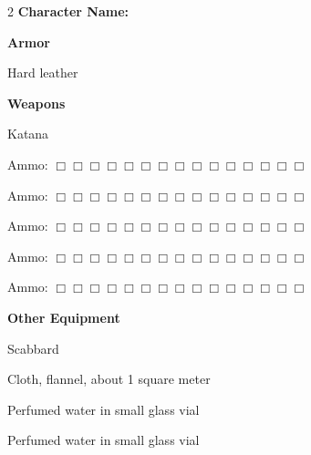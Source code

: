 \documentclass[10pt]{article}
\begin{document}
\begin{multicols}{2}
\textbf{Character Name:} \hrulefill

\vspace{24pt}

\textbf{Armor}


Hard leather




\hrulefill


\hrulefill


\hrulefill



\vspace{24pt}

\textbf{Weapons}


Katana




\hrulefill

Ammo: $\Box \Box \Box \Box \Box \Box \Box \Box \Box \Box \Box \Box \Box \Box \Box$ 


\hrulefill

Ammo: $\Box \Box \Box \Box \Box \Box \Box \Box \Box \Box \Box \Box \Box \Box \Box$ 


\hrulefill

Ammo: $\Box \Box \Box \Box \Box \Box \Box \Box \Box \Box \Box \Box \Box \Box \Box$ 


\hrulefill

Ammo: $\Box \Box \Box \Box \Box \Box \Box \Box \Box \Box \Box \Box \Box \Box \Box$ 


\hrulefill

Ammo: $\Box \Box \Box \Box \Box \Box \Box \Box \Box \Box \Box \Box \Box \Box \Box$ 



\vspace{24pt}

\textbf{Other Equipment}


Scabbard


Cloth, flannel, about 1 square meter


Perfumed water in small glass vial


Perfumed water in small glass vial




\hrulefill


\hrulefill


\hrulefill


\hrulefill


\hrulefill


\hrulefill


\hrulefill



\end{multicols}
\end{document}
